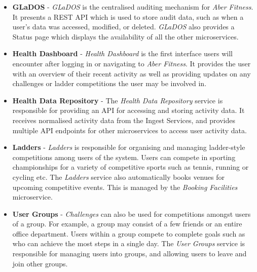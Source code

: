 \begin{itemize}
	\item \textbf{GLaDOS} - \textit{GLaDOS} is the centralised auditing mechanism for \textit{Aber Fitness}. It presents a REST API which is used to store audit data, such as when a user's data was accessed, modified, or deleted. \textit{GLaDOS} also provides a Status page which displays the availability of all the other microservices.

	\item \textbf{Health Dashboard} - \textit{Health Dashboard} is the first interface users will encounter after logging in or navigating to \textit{Aber Fitness}. It provides the user with an overview of their recent activity as well as providing updates on any challenges or ladder competitions the user may be involved in.

	\item \textbf{Health Data Repository} - The \textit{Health Data Repository} service is responsible for providing an API for accessing and storing activity data. It receives normalised activity data from the Ingest Services, and provides multiple API endpoints for other microservices to access user activity data. 

	\item \textbf{Ladders} - \textit{Ladders} is responsible for organising and managing ladder-style competitions among users of the system. Users can compete in sporting championships for a variety of competitive sports such as tennis, running or cycling etc. The \textit{Ladders} service also automatically books venues for upcoming competitive events. This is managed by the \textit{Booking Facilities} microservice.

	\item \textbf{User Groups} - \textit{Challenges} can also be used for competitions amongst users of a group. For example, a group may consist of a few friends or an entire office department. Users within a group compete to complete goals such as who can achieve the most steps in a single day. The \textit{User Groups} service is responsible for managing users into groups, and allowing users to leave and join other groups.

\end{itemize}
